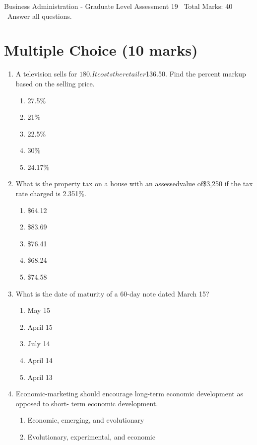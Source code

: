 \documentclass[12pt]{article}
\begin{document}
\begin{center}
Business Administration - Graduate Level Assessment 19 \
Total Marks: 40 \
Answer all questions.
\end{center}

\section*{Multiple Choice (10 marks)}
\begin{enumerate}[label=\arabic*.]
\item A television sells for $180. It costs the retailer $136.50. Find the percent markup based on the selling price.
\begin{enumerate}[label=(\alph*)]
    \item 27.5\%
    \item 21\%
    \item 22.5\%
    \item 30\%
    \item 24.17\%
\end{enumerate}
\item What is the property tax on a house with an assessedvalue of\$3,250 if the tax rate charged is 2.351\%.
\begin{enumerate}[label=(\alph*)]
    \item \$64.12
    \item \$83.69
    \item \$76.41
    \item \$68.24
    \item \$74.58
\end{enumerate}
\item What is the date of maturity of a 60-day note dated March 15?
\begin{enumerate}[label=(\alph*)]
    \item May 15
    \item April 15
    \item July 14
    \item April 14
    \item April 13
\end{enumerate}
\item Economic-marketing should encourage long-term economic development as opposed to short- term economic development.
\begin{enumerate}[label=(\alph*)]
    \item Economic, emerging, and evolutionary
    \item Evolutionary, experimental, and economic

\end{enumerate}
\end{enumerate}
\end{document}

